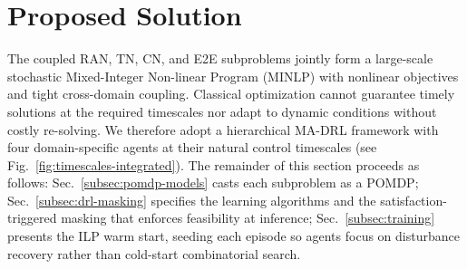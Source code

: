 \documentclass[12pt,lettersize,journal,onecolumn]{IEEEtran}
\begin{document}
\section{Proposed Solution} \label{solution-section}
The coupled RAN, TN, CN, and E2E subproblems jointly form a large-scale stochastic Mixed-Integer Non-linear Program (MINLP) with nonlinear objectives and tight cross-domain coupling. Classical optimization cannot guarantee timely solutions at the required timescales nor adapt to dynamic conditions without costly re-solving. We therefore adopt a hierarchical MA-DRL framework with four domain-specific agents at their natural control timescales (see Fig.~\ref{fig:timescales-integrated}). The remainder of this section proceeds as follows: Sec.~\ref{subsec:pomdp-models} casts each subproblem as a POMDP; Sec.~\ref{subsec:drl-masking} specifies the learning algorithms and the satisfaction-triggered masking that enforces feasibility at inference; Sec.~\ref{subsec:training} presents the ILP warm start, seeding each episode so agents focus on disturbance recovery rather than cold-start combinatorial search. %
\end{document}
